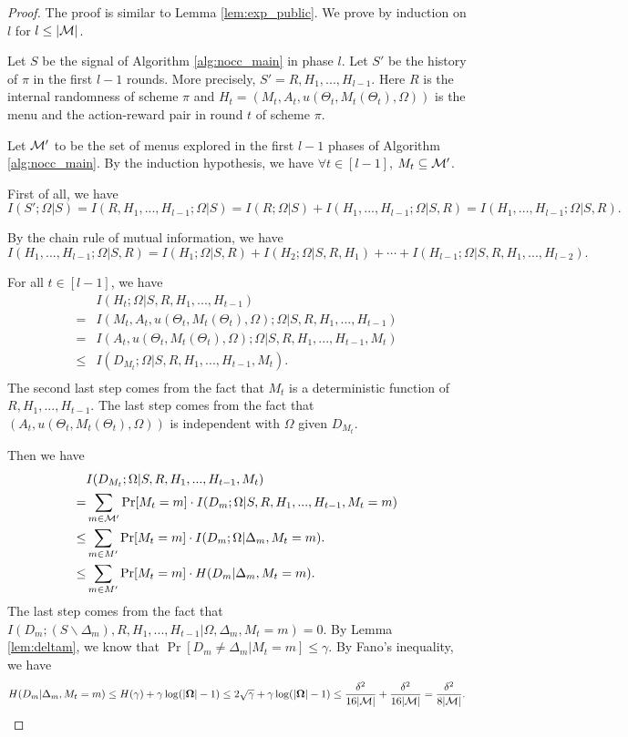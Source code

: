 \begin{proof}
The proof is similar to Lemma \ref{lem:exp_public}. We prove by induction on $l$ for $l \leq |\mathcal{M}|$. 


Let $S$ be the signal of Algorithm \ref{alg:nocc_main} in phase $l$. Let $S'$ be the history of $\pi$ in the first $l-1$ rounds. More precisely, $S' = R, H_1,...,H_{l-1}$. Here $R$ is the internal randomness of scheme $\pi$ and $H_t = (M_t, A_t,u(\Theta_t, M_t(\Theta_t), \Omega))$ is the menu and the action-reward pair in round $t$ of scheme $\pi$. 

Let $\mathcal{M}'$ to be the set of menus explored in the first $l-1$ phases of Algorithm \ref{alg:nocc_main}. By the induction hypothesis, we have $\forall t\in[l-1]$, $M_t \subseteq \mathcal{M}'$. 

First of all, we have
\[
I(S'; \Omega| S) = I(R,H_1,...,H_{l-1}; \Omega| S)  = I(R; \Omega| S) + I(H_1,...,H_{l-1}; \Omega|S, R) = I(H_1,...,H_{l-1}; \Omega|S, R). 
\]

By the chain rule of mutual information, we have
\[
 I(H_1,...,H_{l-1}; \Omega|S, R) = I(H_1;\Omega|S,R) + I(H_2;\Omega|S, R ,H_1) + \cdots + I(H_{l-1}; \Omega|S,R,H_1,...,H_{l-2}). 
\]

For all $t \in [l-1]$, we have
\begin{align*}
&I(H_t; \Omega|S,R,H_1,...,H_{t-1}) \\
=& I(M_t,A_t, u(\Theta_t, M_t(\Theta_t), \Omega); \Omega|S,R,H_1,...,H_{t-1}) \\
=& I(A_t, u(\Theta_t, M_t(\Theta_t), \Omega); \Omega | S,R,H_1,...,H_{t-1}, M_t)\\
\leq& I(D_{M_t}; \Omega|S,R,H_1,...,H_{t-1},M_t). \\
\end{align*}
The second last step comes from the fact that $M_t$ is a deterministic function of $R,H_1,...,H_{t-1}$. The last step comes from the fact that $(A_t,u(\Theta_t, M_t(\Theta_t), \Omega))$ is independent with $\Omega$ given $D_{M_t}$.

Then we have
\begin{align*}
& I(D_{M_t}; \Omega|S,R,H_1,...,H_{t-1},M_t)\\
=& \sum_{m \in \mathcal{M}'} \Pr[M_t = m] \cdot I(D_m;\Omega | S,R,H_1,...,H_{t-1},M_t = m)\\
\leq& \sum_{m \in M'} \Pr[M_t = m] \cdot I(D_m;\Omega| \Delta_m, M_t =m).\\
\leq& \sum_{m \in M'} \Pr[M_t = m] \cdot H(D_m| \Delta_m, M_t =m).
\end{align*}
The last step comes from the fact that $I(D_m; (S\backslash \Delta_m),R,H_1,...,H_{t-1}|\Omega, \Delta_m, M_t =m) = 0$. By Lemma \ref{lem:deltam}, we know that $\Pr[D_m \neq \Delta_m|M_t = m] \leq \gamma$. By Fano's inequality, we have
\[
H(D_m| \Delta_m, M_t =m) \leq H(\gamma) + \gamma \log(|\bold{\Omega}| - 1) \leq 2\sqrt{\gamma} + \gamma \log(|\bold{\Omega}| - 1)\leq \frac{\delta^2}{16|\mathcal{M}|}+\frac{\delta^2}{16|\mathcal{M}|}  = \frac{\delta^2}{8|\mathcal{M}|}. 
\]


\end{proof}
